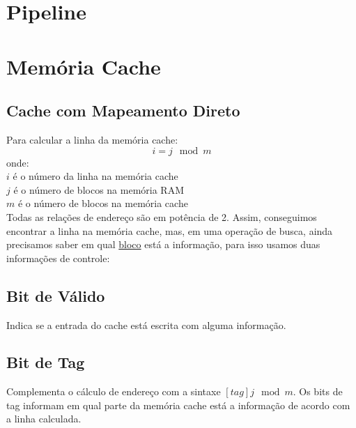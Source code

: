 \documentclass{article}
\begin{document}
	\section{Pipeline}
	\section{Memória Cache}
		\subsection{Cache com Mapeamento Direto}
			Para calcular a linha da memória cache:
			$$i = j \mod m$$
			onde:\\
			$i$ é o número da linha na memória cache\\
			$j$ é o número de blocos na memória RAM\\
			$m$ é o número de blocos na memória cache\\
			Todas as relações de endereço são em potência de 2. Assim, conseguimos encontrar a linha na memória cache, mas, em uma operação de busca, ainda precisamos saber em qual \underline{bloco} está a informação, para isso usamos duas informações de controle:			
		\subsection{Bit de Válido}
			Indica se a entrada do cache está escrita com alguma informação.
		\subsection{Bit de Tag}
			Complementa o cálculo de endereço com a sintaxe $[tag]j \mod m$. Os bits de tag informam em qual parte da memória cache está a informação de acordo com a linha calculada.
\end{document}
